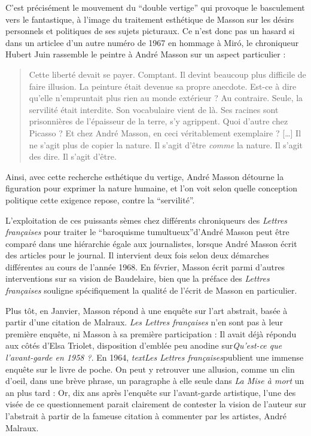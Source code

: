 	 C’est précisément le mouvement du \enquote{double vertige} qui provoque le basculement vers le fantastique, à l’image du traitement esthétique de Masson sur les désirs personnels et politiques de ses sujets picturaux. Ce n’est donc pas un hasard si dans un articlee d’un autre numéro de 1967 en hommage à Miró, le chroniqueur Hubert Juin rassemble le peintre à André Masson sur un aspect particulier : 
\begin{quote}
Cette liberté devait se payer. Comptant. Il devint beaucoup plus difficile de faire illusion. La peinture était devenue sa propre anecdote. Est-ce à dire qu’elle n’empruntait plus rien au monde extérieur ?  Au contraire. Seule, la servilité était interdite. Son vocabulaire vient de là. Ses racines sont prisonnières de l’épaisseur de la terre, s’y agrippent. Quoi d’autre chez Picasso ? Et chez André Masson, en ceci véritablement exemplaire ? […] Il ne s’agit plus de copier la nature. Il s’agit d’être \emph{comme} la nature. Il s’agit des dire. Il s’agit d’être.  	
\end{quote}	 


	Ainsi, avec cette recherche esthétique du vertige, André Masson détourne la figuration pour exprimer la nature humaine, et l’on voit selon quelle conception politique cette exigence repose, contre la \enquote{servilité}. 

	L’exploitation de ces puissants sèmes chez différents chroniqueurs des \emph{Lettres françaises} pour traiter le \enquote{baroquisme tumultueux}d’André Masson peut être comparé dans une hiérarchie égale aux journalistes, lorsque André Masson écrit des articles pour le journal. Il intervient deux fois selon deux démarches différentes au cours de l’année 1968. En février, Masson écrit parmi d’autres interventions sur sa vision de Baudelaire, bien que la préface des \emph{Lettres françaises} souligne spécifiquement la qualité de l’écrit de Masson en particulier. 

	Plus tôt, en Janvier, Masson répond à une enquête sur l’art abstrait, basée à partir d’une citation de Malraux. \emph{Les Lettres françaises} n’en sont pas à leur première enquête, ni Masson à sa première participation : Il avait déjà répondu aux côtés d’Elsa Triolet, disposition d’emblée peu anodine sur\emph{Qu’est-ce que l’avant-garde en 1958 ?}. En 1964, \emph{textLes Lettres françaises}publient une immense enquête sur le livre de poche. On peut y retrouver une allusion, comme un clin d’oeil, dans une brève phrase, un paragraphe à elle seule dans \emph{La Mise à mort} un an plus tard : Or, dix ans après l’enquête sur l’avant-garde artistique, l’une des visée de ce questionnement parait clairement de contester la vision de l’auteur sur l’abstrait à partir  de la fameuse citation à commenter par les artistes, André Malraux. 

